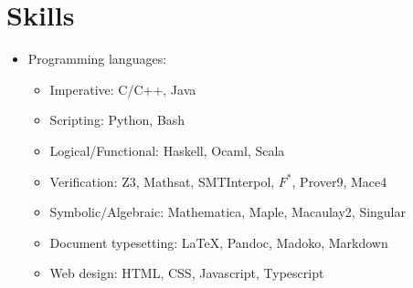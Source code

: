 \section{Skills}

\begin{itemize}
 
\item Programming languages:
  \begin{itemize}
  \item Imperative: C/C++, Java
  \item Scripting: Python, Bash
  \item Logical/Functional: Haskell, Ocaml, Scala
  \item Verification: Z3, Mathsat, SMTInterpol, 
    $F^{*}$, Prover9, Mace4 
  \item Symbolic/Algebraic: Mathematica, Maple, Macaulay2, Singular
  \item Document typesetting: \LaTeX, Pandoc, Madoko, Markdown
  \item Web design: HTML, CSS, Javascript, Typescript
  \end{itemize}
  
\end{itemize}

